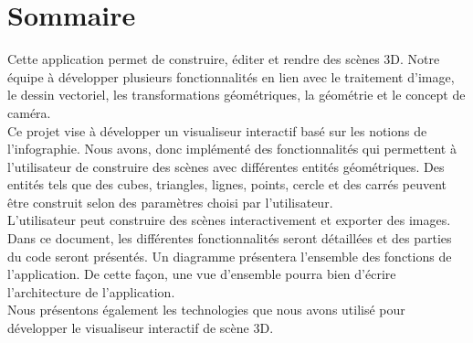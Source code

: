 \chapter{Sommaire}
\label{s:sommaire}

Cette application permet de construire, éditer et rendre des scènes 3D.  Notre équipe à développer plusieurs fonctionnalités en lien avec le traitement d’image, le dessin vectoriel, les transformations géométriques, la géométrie et le concept de caméra. \\
Ce projet vise à développer un visualiseur interactif basé sur les notions de l’infographie. Nous avons, donc implémenté des fonctionnalités qui permettent à l’utilisateur de construire des scènes avec différentes entités géométriques.  Des entités tels que des cubes, triangles, lignes, points, cercle et des carrés peuvent être construit selon des paramètres choisi par l’utilisateur. \\
L’utilisateur peut construire des scènes interactivement et exporter des images. \\
Dans ce document, les différentes fonctionnalités seront détaillées et des parties du code seront présentés.  Un diagramme présentera l’ensemble des fonctions de l’application.  De cette façon, une vue d’ensemble pourra bien d’écrire l’architecture de l’application.\\
Nous présentons également les technologies que nous avons utilisé pour développer le visualiseur interactif de scène 3D. \\
 
